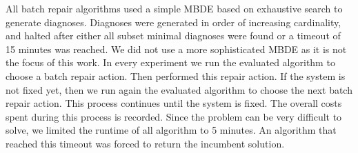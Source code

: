 All batch repair algorithms used a simple MBDE based on exhaustive search to generate diagnoses. Diagnoses were generated in order of increasing cardinality, and halted after either all subset minimal diagnoses were found or a timeout of 15 minutes was reached. We did not use a more sophisticated MBDE as it is not the focus of this work. 
In every experiment we run the evaluated algorithm to choose a batch repair action. Then performed this repair action. 
If the system is not fixed yet, then we run again the evaluated algorithm to choose the next batch repair action. This process continues until the system is fixed. The overall costs 
spent during this process is recorded. Since the \brps{} problem can be very difficult to solve, we limited the runtime of all algorithm to 5 minutes. 
An algorithm that reached this timeout was forced to return the incumbent solution. 



